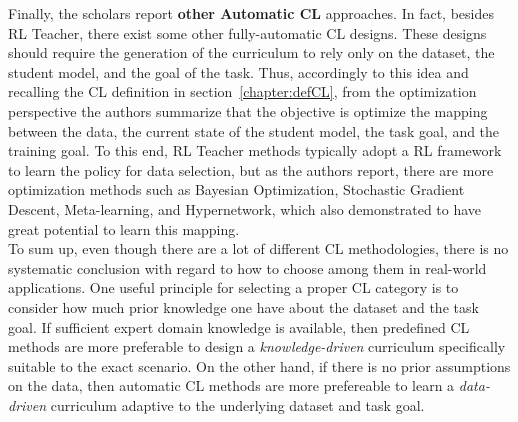 Finally, the scholars report \textbf{other Automatic CL} approaches. In fact, besides RL Teacher,
there exist some other fully-automatic CL designs. These designs should require the generation of the 
curriculum to rely only on the dataset, the student model, and the goal of the task.
Thus, accordingly to this idea and recalling the CL definition in section~\ref{chapter:defCL}, from the optimization
perspective the authors summarize that the objective is optimize the mapping between the data, the current state 
of the student model, the task goal, and the training goal. To this end, RL Teacher methods typically adopt a RL framework to learn 
the policy for data selection, but as the authors report, there are more optimization methods 
such as Bayesian Optimization, Stochastic Gradient Descent, Meta-learning, and Hypernetwork, which also demonstrated to have great potential to learn 
this mapping.\\
\newline
To sum up, even though there are a lot of different CL methodologies, there is no systematic conclusion 
with regard to how to choose among them in real-world applications. One useful principle for selecting 
a proper CL category is to consider how much prior knowledge one have about the dataset and the task goal.
If sufficient expert domain knowledge is available, then predefined CL methods are more preferable to design a \textit{knowledge-driven} curriculum 
specifically suitable to the exact scenario. On the other hand, if there is no prior assumptions on the data, then 
automatic CL methods are more prefereable to learn a \textit{data-driven} curriculum adaptive to the underlying dataset and task goal.

